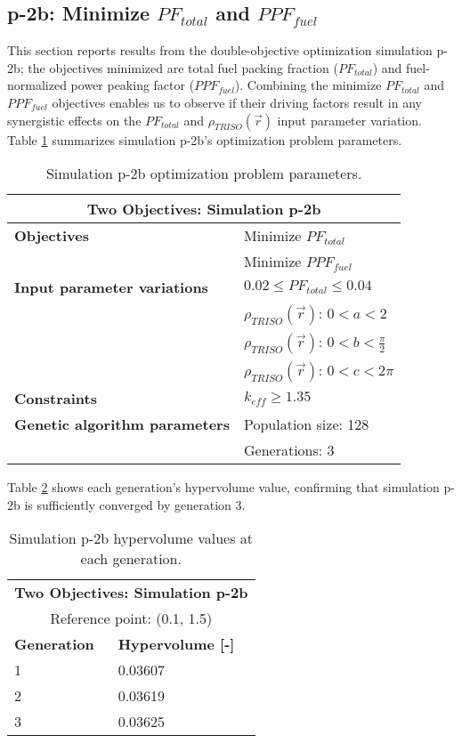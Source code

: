 \subsection{p-2b: Minimize $PF_{total}$ and $PPF_{fuel}$}
\label{sec:p-2b}
This section reports results from the double-objective optimization simulation p-2b; the 
objectives minimized are total fuel packing fraction ($PF_{total}$) and fuel-normalized 
power peaking factor ($PPF_{fuel}$).  
Combining the minimize $PF_{total}$ and $PPF_{fuel}$ objectives enables us to observe if 
their driving factors result in any synergistic effects on the $PF_{total}$ and 
$\rho_{TRISO}(\vec{r})$ input parameter variation. 
Table \ref{tab:simulationp2b} summarizes simulation p-2b's optimization problem parameters. 
\begin{table}[htbp!]
    \centering
    \onehalfspacing
    \caption{Simulation p-2b optimization problem parameters.}
	\label{tab:simulationp2b}
    \footnotesize
    \begin{tabular}{l|p{4cm}}
    \hline 
    \multicolumn{2}{c}{\textbf{Two Objectives: Simulation p-2b}} \\
    \hline 
    \textbf{Objectives} & Minimize $PF_{total}$ \\
    & Minimize $PPF_{fuel}$ \\
    \hline 
    \textbf{Input parameter variations} & $0.02 \leq PF_{total} \leq 0.04$ \\
    & $\rho_{TRISO}(\vec{r})$: $0<a<2$ \\
    & $\rho_{TRISO}(\vec{r})$: $0<b<\frac{\pi}{2}$ \\
    & $\rho_{TRISO}(\vec{r})$: $0<c<2\pi$ \\
    \hline
    \textbf{Constraints} & $k_{eff} \geq 1.35$\\ 
    \hline 
    \textbf{Genetic algorithm parameters} & Population size: 128 \\
    & Generations: 3 \\
    \hline
    \end{tabular}
\end{table}

Table \ref{tab:p2b-hypervolume} shows each generation's hypervolume value, 
confirming that simulation p-2b is sufficiently converged by generation 3. 
\begin{table}[htbp!]
    \centering
    \onehalfspacing
    \caption{Simulation p-2b hypervolume values at each generation.}
	\label{tab:p2b-hypervolume}
    \footnotesize
    \begin{tabular}{ll}
    \hline 
    \multicolumn{2}{c}{\textbf{Two Objectives: Simulation p-2b}} \\
    \multicolumn{2}{c}{Reference point: (0.1, 1.5)} \\
    \hline 
    \textbf{Generation} & \textbf{Hypervolume [-]} \\
    \hline
    1 & 0.03607 \\
    2 & 0.03619 \\
    3 & 0.03625 \\
    \hline
    \end{tabular}
\end{table}

